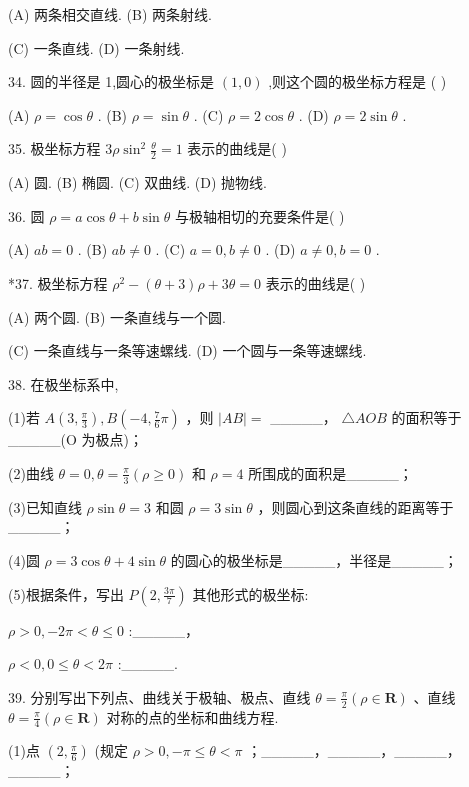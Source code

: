 \documentclass[10pt]{article}
\newcommand*\circled[1]{\tikz[baseline=(char.base)]{\node[shape=circle,draw,inner sep=1.5pt] (char) {\small #1};}}
\begin{document}
(A) 两条相交直线. (B) 两条射线.

(C) 一条直线. (D) 一条射线.

34. 圆的半径是 1,圆心的极坐标是 \(\left( {1,0}\right)\) ,则这个圆的极坐标方程是 ( )

(A) \(\rho  = \cos \theta\) . (B) \(\rho  = \sin \theta\) . (C) \(\rho  = 2\cos \theta\) . (D) \(\rho  = 2\sin \theta\) .

35. 极坐标方程 \({3\rho }{\sin }^{2}\frac{\theta }{2} = 1\) 表示的曲线是( )

(A) 圆. (B) 椭圆. (C) 双曲线. (D) 抛物线.

36. 圆 \(\rho  = a\cos \theta  + b\sin \theta\) 与极轴相切的充要条件是( )

(A) \({ab} = 0\) . (B) \({ab} \neq  0\) . (C) \(a = 0,b \neq  0\) . (D) \(a \neq  0,b = 0\) .

*37. 极坐标方程 \({\rho }^{2} - \left( {\theta  + 3}\right) \rho  + {3\theta } = 0\) 表示的曲线是( )

(A) 两个圆. (B) 一条直线与一个圆.

(C) 一条直线与一条等速螺线. (D) 一个圆与一条等速螺线.

38. 在极坐标系中,

(1)若 \(A\left( {3,\frac{\pi }{3}}\right) ,B\left( {-4,\frac{7}{6}\pi }\right)\) ，则 \(\left| {AB}\right|  =\) \_\_\_\_\_， \(\bigtriangleup  {AOB}\) 的面积等于\_\_\_\_\_(O 为极点)；

(2)曲线 \(\theta  = 0,\theta  = \frac{\pi }{3}\left( {\rho  \geq  0}\right)\) 和 \(\rho  = 4\) 所围成的面积是\_\_\_\_\_；

(3)已知直线 \(\rho \sin \theta  = 3\) 和圆 \(\rho  = 3\sin \theta\) ，则圆心到这条直线的距离等于\_\_\_\_\_；

(4)圆 \(\rho  = 3\cos \theta  + 4\sin \theta\) 的圆心的极坐标是\_\_\_\_\_，半径是\_\_\_\_\_；

(5)根据条件，写出 \(P\left( {2,\frac{3\pi }{7}}\right)\) 其他形式的极坐标:

 \circled{1}  \(\rho  > 0, - {2\pi } < \theta  \leq  0\) :\_\_\_\_\_，

 \circled{2}  \(\rho  < 0,0 \leq  \theta  < {2\pi }\) :\_\_\_\_\_.

39. 分别写出下列点、曲线关于极轴、极点、直线 \(\theta  = \frac{\pi }{2}\left( {\rho  \in  \mathbf{R}}\right)\) 、直线 \(\theta  = \frac{\pi }{4}\left( {\rho  \in  \mathbf{R}}\right)\) 对称的点的坐标和曲线方程.

(1)点 \(\left( {2,\frac{\pi }{6}}\right)\) (规定 \(\rho  > 0, - \pi  \leq  \theta  < \pi\) ；\_\_\_\_\_，\_\_\_\_\_，\_\_\_\_\_，\_\_\_\_\_；
\end{document}
